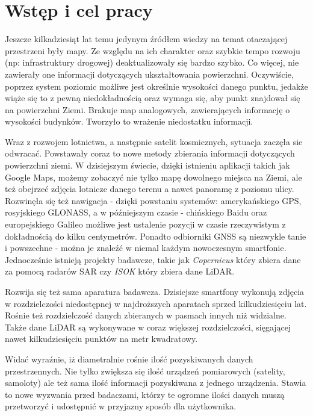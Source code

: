 \chapter{Wst\k{e}p i cel pracy}

Jeszcze kilkadziesiąt lat temu jedynym źródłem wiedzy na temat otaczającej przestrzeni były mapy.
Ze względu na ich charakter oraz szybkie tempo rozwoju (np: infrastruktury drogowej) deaktualizowały
się bardzo szybko. Co więcej, nie zawierały one informacji dotyczących ukształtowania powierzchni.
Oczywiście, poprzez system poziomic możliwe jest określnie wysokości danego punktu, jedakże wiąże się to
z pewną niedokładnością oraz wymaga się, aby punkt znajdował się na powierzchni Ziemi. Brakuje
map analogowych, zawierających informację o wysokości budynków. Tworzyło to wrażenie niedostatku informacji.

Wraz z rozwojem lotnictwa, a następnie satelit kosmicznych, sytuacja zaczęła sie odwracać. Powstawały coraz to
nowe metody zbierania informacji dotyczących powierzchni ziemi. W dzisiejszym świecie, dzięki istnieniu aplikacji
takich jak Google Maps, możemy zobaczyć nie tylko mapę dowolnego miejsca na Ziemi,
ale też obejrzeć zdjęcia lotnicze danego terenu a nawet panoramę z poziomu ulicy. Rozwinęła się też nawigacja - dzięki powstaniu
systemów: amerykańskiego GPS, rosyjskiego GLONASS, a w późniejszym czasie - chińskiego Baidu oraz europejskiego Galileo możliwe
jest ustalenie pozycji w czasie rzeczywistym z dokładnością do kilku centymetrów. Ponadto odbiorniki GNSS są niezwykle tanie i
powszechne - można je znaleźć w niemal każdym nowoczesnym smartfonie.
Jednocześnie istnieją projekty badawcze, takie jak
\textit{Copernicus}\cite{webiste:copernicus} który zbiera dane za pomocą radarów SAR czy \textit{ISOK}\cite{website:isok} który zbiera
dane LiDAR.

Rozwija się też sama aparatura badawcza. Dzisiejsze smartfony wykonują zdjęcia w rozdzielczości niedostępnej w najdroższych
aparatach sprzed kilkudziesięciu lat. Rośnie też rozdzielczość danych zbieranych w pasmach innych niż widzialne.
Także dane LiDAR są wykonywane w coraz większej rozdzielczości, sięgającej nawet kilkudziesięciu punktów na metr kwadratowy.

Widać wyraźnie, iż diametralnie rośnie ilość pozyskiwanych danych przestrzennych. Nie tylko zwiększa się ilość urządzeń
pomiarowych (satelity, samoloty) ale też sama ilość informacji pozyskiwana z jednego urządzenia. Stawia to nowe wyzwania przed badaczami,
którzy te ogromne ilości danych muszą przetworzyć i udostępnić w przyjazny sposób dla użytkownika.

